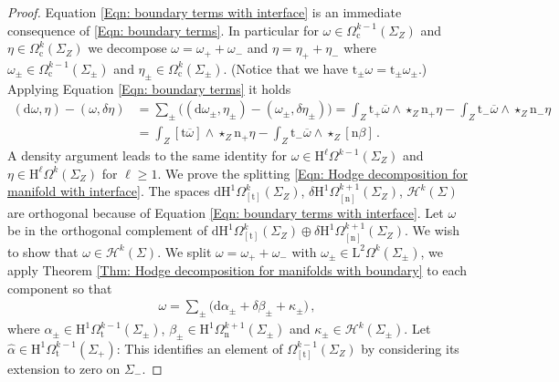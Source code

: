 \begin{proof}
	Equation \eqref{Eqn: boundary terms with interface} is an immediate consequence of \eqref{Eqn: boundary terms}.
	In particular for $\omega\in \Omega_\mathrm{c}^{k-1}(\Sigma_Z)$ and $\eta\in \Omega_\mathrm{c}^k(\Sigma_Z)$ we decompose $\omega=\omega_++\omega_-$ and $\eta=\eta_++\eta_-$ where $\omega_\pm\in \Omega_\mathrm{c}^{k-1}(\Sigma_\pm)$ and $\eta_\pm\in \Omega_\mathrm{c}^k(\Sigma_\pm)$.
	(Notice that we have $\mathrm{t}_\pm\omega=\mathrm{t}_\pm\omega_\pm$.)
	Applying Equation \eqref{Eqn: boundary terms} it holds
	\begin{align*}
		(\mathrm{d}\omega,\eta)-(\omega,\delta\eta)&=
		\sum_\pm\big((\mathrm{d}\omega_\pm,\eta_\pm)-(\omega_\pm,\delta\eta_\pm)\big)=
		\int_Z\mathrm{t}_+\overline{\omega}\wedge\star_Z\mathrm{n}_+\eta-
		\int_Z\mathrm{t}_-\overline{\omega}\wedge\star_Z\mathrm{n}_-\eta\\&=
		\int_Z[\mathrm{t}\overline{\omega}]\wedge\star_Z\mathrm{n}_+\eta-
		\int_Z\mathrm{t}_-\overline{\omega}\wedge\star_Z[\mathrm{n}\beta]\,.
	\end{align*}
	A density argument leads to the same identity for $\omega\in\mathrm{H}^\ell\Omega^{k-1}(\Sigma_Z)$ and $\eta\in\mathrm{H}^{\ell}\Omega^k(\Sigma_Z)$ for $\ell\geq 1$.
	We prove the splitting \eqref{Eqn: Hodge decomposition for manifold with interface}.
	The spaces $\mathrm{d} \mathrm{H}^1\Omega^k_{[\mathrm{t}]}(\Sigma_Z)$, $\delta \mathrm{H}^1\Omega^{k+1}_{[\mathrm{n}]}(\Sigma_Z)$, $\mathcal{H}^k(\Sigma)$ are orthogonal because of Equation \eqref{Eqn: boundary terms with interface}.
	Let $\omega$ be in the orthogonal complement of $\mathrm{d} \mathrm{H}^1\Omega^k_{[\mathrm{t}]}(\Sigma_Z)\oplus\delta \mathrm{H}^1\Omega^{k+1}_{[\mathrm{n}]}(\Sigma_Z)$.
	We wish to show that $\omega\in\mathcal{H}^k(\Sigma)$.
	We split $\omega=\omega_++\omega_-$ with $\omega_\pm\in\mathrm{L}^2\Omega^k(\Sigma_\pm)$, we apply Theorem \ref{Thm: Hodge decomposition for manifolds with boundary} to each component so that
	\begin{align*}
		\omega=
		\sum_\pm\big(\mathrm{d}\alpha_\pm+\delta\beta_\pm+\kappa_\pm\big)\,,
	\end{align*}
	where $\alpha_\pm\in\mathrm{H}^1\Omega^{k-1}_{\mathrm{t}}(\Sigma_\pm)$, $\beta_\pm\in\mathrm{H}^1\Omega^{k+1}_{\mathrm{n}}(\Sigma_\pm)$ and $\kappa_\pm\in\mathcal{H}^k(\Sigma_\pm)$.
	Let $\hat{\alpha}\in\mathrm{H}^1\Omega^{k-1}_{\mathrm{t}}(\Sigma_+)$: This identifies an element of $\Omega^{k-1}_{[\mathrm{t}]}(\Sigma_Z)$ by considering its extension to zero on $\Sigma_-$.

\end{proof}

